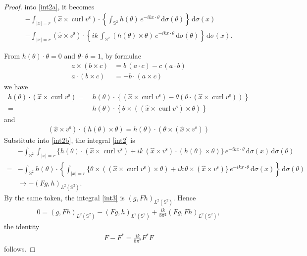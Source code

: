 \documentclass[a4paper,12pt]{article}
\theoremstyle{definition}
\newcommand\intb[2][x]{\int_{|x|=r}#2\,\text{d}\sigma(#1)}
\newcommand\intc[2][(\theta)]{\int_{\mathbb{S}^2}#2\,\text{d}\sigma#1}
\DeclareMathOperator\curl{curl}
\begin{document}
\begin{proof}
  into \eqref{int2a}, it becomes 
  \begin{multline}\label{int2b}
    -\intb{\left(\hat{x}\times\curl{v^\text{s}}\right)\cdot\left\{\intc{h(\theta)\,e^{-i k x\cdot\theta}}\right\}} \\
    -\intb{\left(\hat{x}\times v^\text{s}\right)\cdot\left\{ik\,\intc{\left(h(\theta)\times\theta\right)\,e^{-i k x\cdot\theta}}\right\}}.
  \end{multline}

  From $h(\theta)\cdot\theta=0$ and $\theta\cdot\theta=1$, by formulae
  \begin{align*}
    a\times\left(b\times c\right) &= b\,\left(a\cdot c\right) - c\,\left(a\cdot b\right) \\
    a\cdot\left(b\times c\right) &= -b\cdot\left(a\times c\right) 
  \end{align*}
  we have  
  \begin{align*}
    h(\theta)\cdot\left(\hat{x}\times\curl{v^\text{s}}\right)=&\,h(\theta)\cdot\left\{\left(\hat{x}\times\curl{v^\text{s}}\right)-\theta\left(\theta\cdot\left(\hat{x}\times\curl{v^\text{s}}\right)\right)\right\} \\
    =&\,h(\theta)\cdot\left\{\theta\times\left(\left(\hat{x}\times\curl{v^\text{s}}\right)\times\theta\right)\right\} 
  \end{align*}
  and 
  \begin{align*}
    \left(\hat{x}\times v^\text{s}\right)\cdot\left(h(\theta)\times\theta\right) = h(\theta)\cdot\left(\theta\times\left(\hat{x}\times v^\text{s}\right)\right)
  \end{align*}
  Substitute into \eqref{int2b}, the integral \eqref{int2} is  
  \begin{align*}
    &-\intc{\intb{\bigl\{h(\theta)\cdot\left(\hat{x}\times\curl{v^\text{s}}\right)+ik\,\left(\hat{x}\times v^\text{s}\right)\cdot\left(h(\theta)\times\theta\right)\bigr\}\,e^{-i k x\cdot\theta}}} \\
    =&-\intc{h(\theta)\cdot\left\{\intb{\bigl\{\theta\times\left(\left(\hat{x}\times\curl{v^\text{s}}\right)\times\theta\right) + ik\,\theta\times\left(\hat{x}\times v^\text{s}\right)\bigr\}\,e^{-i k x\cdot\theta}}\right\}} \\
    &\longrightarrow-\left(Fg, h\right)_{L^2(\mathbb{S}^2)}.
  \end{align*}
  By the same token, the integral \eqref{int3} is $\left(g, Fh\right)_{L^2(\mathbb{S}^2)}$. Hence
  \begin{align*}
    0 = \left(g, Fh\right)_{L^2(\mathbb{S}^2)} -\left(Fg, h\right)_{L^2(\mathbb{S}^2)} + \frac{ik}{8\pi^2}\left(Fg, Fh\right)_{L^2(\mathbb{S}^2)},
  \end{align*}
  the identity
  \begin{align*}
    F - F^* = \frac{ik}{8\pi^2} F^*F
  \end{align*}
  follows.
  

\end{proof}
\end{document}
